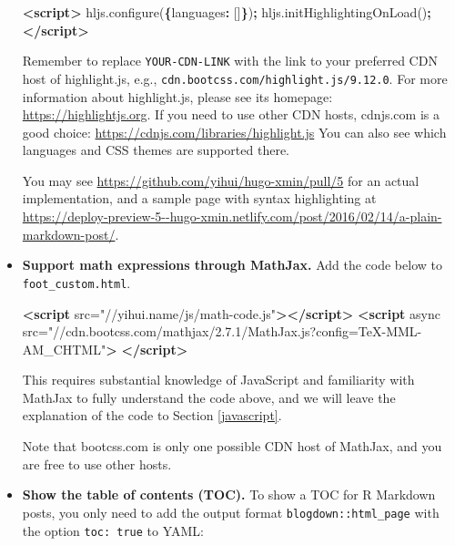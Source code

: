 \documentclass[12pt,]{krantz}
\makeatletter
\newenvironment{Shaded}{\begin{snugshade}}{\end{snugshade}}
\newcommand{\AttributeTok}[1]{\textcolor[rgb]{0.77,0.63,0.00}{#1}}
\newcommand{\DataTypeTok}[1]{\textcolor[rgb]{0.13,0.29,0.53}{#1}}
\newcommand{\KeywordTok}[1]{\textcolor[rgb]{0.13,0.29,0.53}{\textbf{#1}}}
\newcommand{\NormalTok}[1]{#1}
\newcommand{\OperatorTok}[1]{\textcolor[rgb]{0.81,0.36,0.00}{\textbf{#1}}}
\newcommand{\OtherTok}[1]{\textcolor[rgb]{0.56,0.35,0.01}{#1}}
\newcommand{\StringTok}[1]{\textcolor[rgb]{0.31,0.60,0.02}{#1}}
\newcommand{\VariableTok}[1]{\textcolor[rgb]{0.00,0.00,0.00}{#1}}
\newenvironment{kframe}{%
\medskip{}
\setlength{\fboxsep}{.8em}
 \def\at@end@of@kframe{}%
 \ifinner\ifhmode%
  \def\at@end@of@kframe{\end{minipage}}%
  \begin{minipage}{\columnwidth}%
 \fi\fi%
 \def\FrameCommand##1{\hskip\@totalleftmargin \hskip-\fboxsep
 \colorbox{shadecolor}{##1}\hskip-\fboxsep
     \hskip-\linewidth \hskip-\@totalleftmargin \hskip\columnwidth}%
 \MakeFramed {\advance\hsize-\width
   \@totalleftmargin\z@ \linewidth\hsize
   \@setminipage}}%
 {\par\unskip\endMakeFramed%
 \at@end@of@kframe}
\renewenvironment{Shaded}{\begin{kframe}}{\end{kframe}}
\theoremstyle{definition}
\theoremstyle{definition}
\theoremstyle{definition}
\theoremstyle{remark}
\makeatother
\begin{document}
\begin{itemize}
\begin{Shaded}
\begin{Highlighting}[]
\KeywordTok{<script>}
\VariableTok{hljs}\NormalTok{.}\AttributeTok{configure}\NormalTok{(}\OperatorTok{\{}\DataTypeTok{languages}\OperatorTok{:}\NormalTok{ []}\OperatorTok{\}}\NormalTok{)}\OperatorTok{;}
\VariableTok{hljs}\NormalTok{.}\AttributeTok{initHighlightingOnLoad}\NormalTok{()}\OperatorTok{;}
\KeywordTok{</script>}
\end{Highlighting}
\end{Shaded}

  Remember to replace \texttt{YOUR-CDN-LINK} with the link to your
  preferred CDN host of highlight.js, e.g.,
  \texttt{cdn.bootcss.com/highlight.js/9.12.0}. For more information
  about highlight.js, please see its homepage:
  \url{https://highlightjs.org}. If you need to use other CDN hosts,
  cdnjs.com is a good choice:
  \url{https://cdnjs.com/libraries/highlight.js} You can also see which
  languages and CSS themes are supported there.

  You may see \url{https://github.com/yihui/hugo-xmin/pull/5} for an
  actual implementation, and a sample page with syntax highlighting at
  \url{https://deploy-preview-5--hugo-xmin.netlify.com/post/2016/02/14/a-plain-markdown-post/}.
\item
  \textbf{Support math expressions through MathJax.} Add the code
  below to \texttt{foot\_custom.html}.

\begin{Shaded}
\begin{Highlighting}[]
\KeywordTok{<script}\OtherTok{ src=}\StringTok{"//yihui.name/js/math-code.js"}\KeywordTok{></script>}
\KeywordTok{<script}\OtherTok{ async}
\OtherTok{src=}\StringTok{"//cdn.bootcss.com/mathjax/2.7.1/MathJax.js?config=TeX-MML-AM_CHTML"}\KeywordTok{>}
\KeywordTok{</script>}
\end{Highlighting}
\end{Shaded}

  This requires substantial knowledge of JavaScript and familiarity with
  MathJax to fully understand the code above, and we will leave the
  explanation of the code to Section \ref{javascript}.

  Note that bootcss.com is only one possible CDN host of MathJax, and
  you are free to use other hosts.
\item
  \textbf{Show the table of contents (TOC).} To show a
  TOC for R Markdown posts, you only need to
  add the output format \texttt{blogdown::html\_page} with the option
  \texttt{toc:\ true} to YAML:


\end{itemize}
\end{document}
